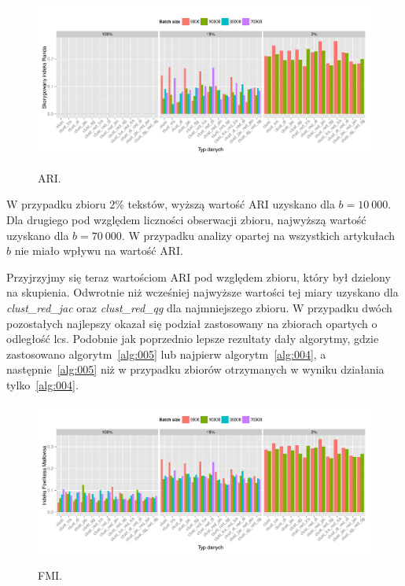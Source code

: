 \documentclass{praca1}
\begin{document}
\begin{figure}[!h]
  \centering
  \includegraphics[width=400pt]{plot13.pdf}\\
  \caption{ARI.}\label{plot:008}
\end{figure}

W przypadku zbioru $2\%$ tekstów, wyższą wartość ARI uzyskano dla $b = 10\ 000$. Dla drugiego pod względem liczności obserwacji zbioru, najwyższą wartość uzyskano dla $b=70\ 000$. W przypadku analizy opartej na wszystkich artykułach $b$ nie miało wpływu na wartość ARI.

Przyjrzyjmy się teraz wartościom ARI pod względem zbioru, który był dzielony na skupienia. Odwrotnie niż wcześniej najwyższe wartości tej miary uzyskano dla \emph{clust\_red\_jac} oraz \emph{clust\_red\_qg} dla najmniejszego zbioru. W przypadku dwóch pozostałych najlepszy okazał się podział zastosowany na zbiorach opartych o odległość lcs. Podobnie jak poprzednio lepsze rezultaty dały algorytmy, gdzie zastosowano algorytm~\ref{alg:005} lub najpierw algorytm~\ref{alg:004}, a następnie~\ref{alg:005} niż w przypadku zbiorów otrzymanych w wyniku działania tylko~\ref{alg:004}.

\begin{figure}[!h]
  \centering
  \includegraphics[width=400pt]{plot15.pdf}\\
  \caption{FMI.}\label{plot:010}
\end{figure}
\end{document}
